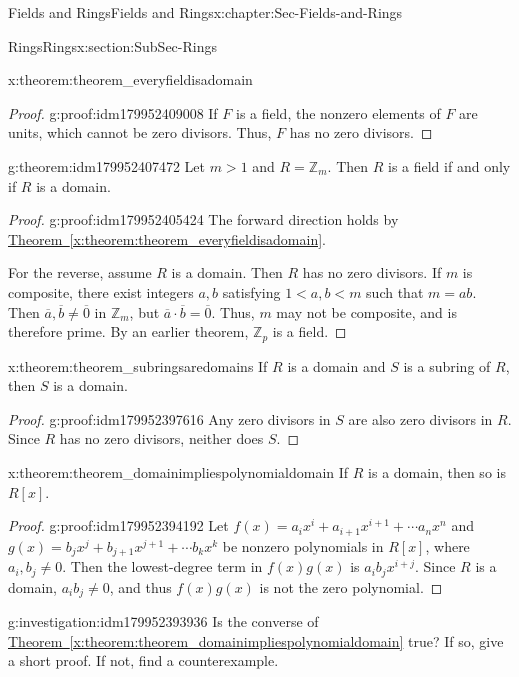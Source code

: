 \documentclass[oneside,10pt,]{book}
\newcommand{\xreffont}{\relax}
\numberwithin{equation}{section}
\def\Z{{\mathbb Z}}
\newcommand{\lt}{<}
\begin{document}
\begin{chapterptx}{Fields and Rings}{}{Fields and Rings}{}{}{x:chapter:Sec-Fields-and-Rings}
\begin{sectionptx}{Rings}{}{Rings}{}{}{x:section:SubSec-Rings}
\begin{theorem}{}{}{x:theorem:theorem_everyfieldisadomain}
\end{theorem}
\begin{proof}{}{g:proof:idm179952409008}
If \(F\) is a field, the nonzero elements of \(F\) are units, which cannot be zero divisors. Thus, \(F\) has no zero divisors.%
\end{proof}
\begin{theorem}{}{}{g:theorem:idm179952407472}%
Let \(m > 1\) and \(R = \Z_m\). Then \(R\) is a field if and only if \(R\) is a domain.%
\end{theorem}
\begin{proof}{}{g:proof:idm179952405424}
The forward direction holds by \hyperref[x:theorem:theorem_everyfieldisadomain]{Theorem~{\xreffont\ref{x:theorem:theorem_everyfieldisadomain}}}.%
\par
For the reverse, assume \(R\) is a domain. Then \(R\) has no zero divisors. If \(m\) is composite, there exist integers \(a,b\) satisfying \(1 \lt a,b \lt m\) such that \(m=ab\). Then \(\overline{a},\overline{b}\ne \overline{0}\) in \(\Z_m\), but \(\overline{a}\cdot \overline{b} = \overline{0}\). Thus, \(m\) may not be composite, and is therefore prime. By an earlier theorem, \(\Z_p\) is a field.%
\end{proof}
\begin{theorem}{}{}{x:theorem:theorem_subringsaredomains}%
If \(R\) is a domain and \(S\) is a subring of \(R\), then \(S\) is a domain.%
\end{theorem}
\begin{proof}{}{g:proof:idm179952397616}
Any zero divisors in \(S\) are also zero divisors in \(R\). Since \(R\) has no zero divisors, neither does \(S\).%
\end{proof}
\begin{theorem}{}{}{x:theorem:theorem_domainimpliespolynomialdomain}%
If \(R\) is a domain, then so is \(R[x]\).%
\end{theorem}
\begin{proof}{}{g:proof:idm179952394192}
Let \(f(x) = a_i x^i + a_{i+1} x^{i+1} + \cdots a_n x^n\) and \(g(x) = b_j x^j + b_{j+1} x^{j+1} + \cdots b_k x^k\) be nonzero polynomials in \(R[x]\), where \(a_i, b_j \ne 0\). Then the lowest-degree term in \(f(x) g(x)\) is \(a_i b_j x^{i+j}\). Since \(R\) is a domain, \(a_i b_j\ne 0\), and thus \(f(x)g(x)\) is not the zero polynomial.%
\end{proof}
\begin{investigation}{}{g:investigation:idm179952393936}%
Is the converse of \hyperref[x:theorem:theorem_domainimpliespolynomialdomain]{Theorem~{\xreffont\ref{x:theorem:theorem_domainimpliespolynomialdomain}}} true? If so, give a short proof. If not, find a counterexample.%

\end{investigation}
\end{sectionptx}
\end{chapterptx}
\end{document}
